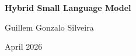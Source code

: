 \begin{titlepage}
    \centering
    \vspace*{4cm}
    {\huge \bfseries Hybrid Small Language Model \par}
    \vspace{1.5cm}
    {\Large Guillem Gonzalo Silveira \par}
    \vspace{1.5cm}
    {\large April 2026 \par}
    \vfill
    \conteoTotal
    \vspace{1cm}
\end{titlepage}